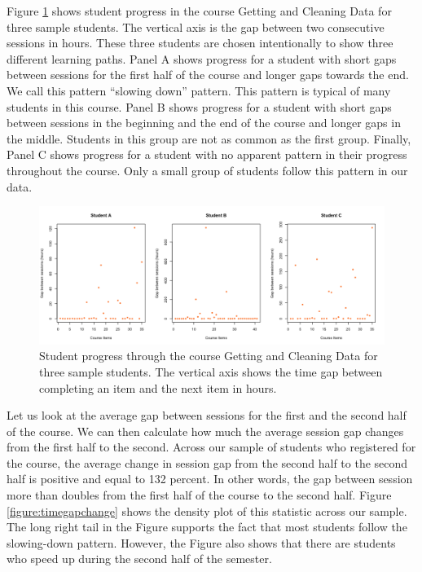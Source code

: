 Figure \ref{figure:sampleprogress} shows student progress in the course
Getting and Cleaning Data for three sample students. The vertical axis
is the gap between two consecutive sessions in hours. These three
students are chosen intentionally to show three different learning
paths. Panel A shows progress for a student with short gaps between
sessions for the first half of the course and longer gaps towards the
end. We call this pattern ``slowing down'' pattern. This pattern is
typical of many students in this course. Panel B shows progress for a
student with short gaps between sessions in the beginning and the end of
the course and longer gaps in the middle. Students in this group are not
as common as the first group. Finally, Panel C shows progress for a
student with no apparent pattern in their progress throughout the
course. Only a small group of students follow this pattern in our data.

\begin{figure}[htbp] 
    \centering
    \includegraphics[scale=0.4]{sampleprogress}
    \caption{Student progress through the course Getting and Cleaning Data for three sample students. The vertical axis shows the time gap between completing an item and the next item in hours.}
    \label{figure:sampleprogress}
\end{figure}

Let us look at the average gap between sessions for the first and the
second half of the course. We can then calculate how much the average
session gap changes from the first half to the second. Across our sample
of students who registered for the course, the average change in session
gap from the second half to the second half is positive and equal to 132
percent. In other words, the gap between session more than doubles from
the first half of the course to the second half. Figure
\ref{figure:timegapchange} shows the density plot of this statistic
across our sample. The long right tail in the Figure supports the fact
that most students follow the slowing-down pattern. However, the Figure
also shows that there are students who speed up during the second half
of the semester.


